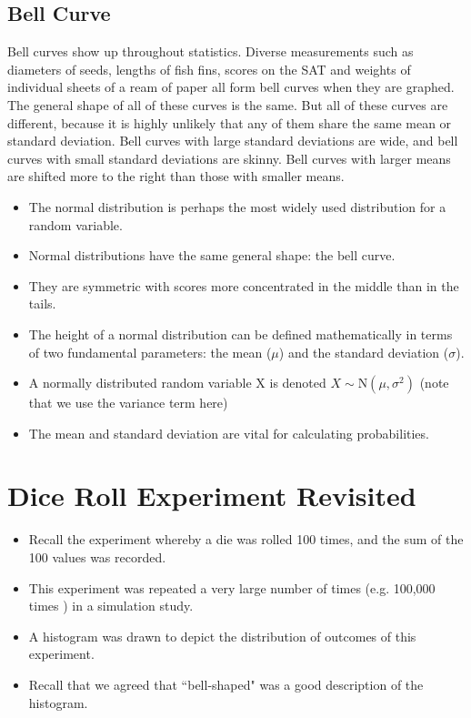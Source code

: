 \documentclass[]{report}
\begin{document}
\subsection{Bell Curve}
Bell curves show up throughout statistics. Diverse measurements such as diameters of seeds, lengths of fish fins, scores on the SAT and weights of individual sheets of a ream of paper all form bell curves when they are graphed. The general shape of all of these curves is the same. But all of these curves are different, because it is highly unlikely that any of them share the same mean or standard deviation. Bell curves with large standard deviations are wide, and bell curves with small standard deviations are skinny. Bell curves with larger means are shifted more to the right than those with smaller means.



\begin{itemize}
	\item The normal distribution is perhaps the most widely used distribution for a random variable.
	\item Normal distributions have the same general shape: the bell curve.
	\item They are symmetric with scores more concentrated in the middle than in the tails.
	\item The height of a normal distribution can be defined mathematically in terms of two fundamental parameters: the mean ($\mu$) and the standard deviation ($\sigma$).
	\item A normally distributed random variable X is denoted $ X \sim \mbox{N} (\mu, \sigma^2)$ (note that we use the variance term here)
	\item The mean and standard deviation are vital for calculating probabilities.
\end{itemize}



\section{Dice Roll Experiment Revisited}
	\begin{itemize}
		\item
		Recall the experiment whereby a die was rolled 100 times, and the sum of the 100 values was recorded.
		\item
		This experiment was repeated a very large number of times (e.g. 100,000 times ) in a simulation study.
		\item
		A histogram was drawn to depict the distribution of outcomes of this experiment.
		\item Recall that we agreed that ``bell-shaped" was a good description of the histogram.
		
	\end{itemize}
	
\end{document}

